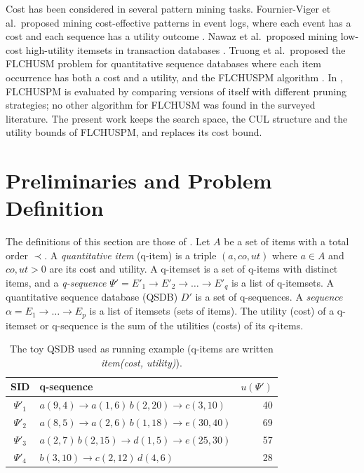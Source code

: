 \documentclass[runningheads]{llncs}
\newcommand{\FL}{\textsc{FLCHUSPM}}
\begin{document}
Cost has been considered in several pattern mining tasks. Fournier-Viger et al.\ proposed
mining cost-effective patterns in event logs, where each event has a cost and each sequence has
a utility outcome \cite{fournier2020cost}. Nawaz et al.\ proposed mining low-cost high-utility
itemsets in transaction databases \cite{nawaz2022lcim}. Truong et al.\ proposed the FLCHUSM
problem for quantitative sequence databases where each item occurrence has both a cost and a
utility, and the \FL{} algorithm \cite{truong2022}. In \cite{truong2022}, \FL{} is evaluated by
comparing versions of itself with different pruning strategies; no other algorithm for FLCHUSM
was found in the surveyed literature. The present work keeps the search space, the CUL structure
and the utility bounds of \FL{}, and replaces its cost bound.

\section{Preliminaries and Problem Definition}\label{sec:prelim}

The definitions of this section are those of \cite{truong2022}. Let $A$ be a set of items with
a total order $\prec$. A \emph{quantitative item} (q-item) is a triple $(a, co, ut)$ where
$a \in A$ and $co, ut > 0$ are its cost and utility. A q-itemset is a set of q-items with
distinct items, and a \emph{q-sequence} $\Psi' = E'_1 \to E'_2 \to \dots \to E'_q$ is a list of
q-itemsets. A quantitative sequence database (QSDB) $D'$ is a set of q-sequences. A
\emph{sequence} $\alpha = E_1 \to \dots \to E_p$ is a list of itemsets (sets of items). The
utility (cost) of a q-itemset or q-sequence is the sum of the utilities (costs) of its q-items.

\begin{table}[t]
\centering
\caption{The toy QSDB used as running example (q-items are written \emph{item(cost, utility)}).}
\label{tab:toy}
\begin{tabular}{@{}cl r@{}}
\toprule
SID & q-sequence & $u(\Psi')$ \\
\midrule
$\Psi'_1$ & $a(9,4) \to a(1,6)\,b(2,20) \to c(3,10)$ & 40 \\
$\Psi'_2$ & $a(8,5) \to a(2,6)\,b(1,18) \to e(30,40)$ & 69 \\
$\Psi'_3$ & $a(2,7)\,b(2,15) \to d(1,5) \to e(25,30)$ & 57 \\
$\Psi'_4$ & $b(3,10) \to c(2,12)\,d(4,6)$ & 28 \\
\bottomrule
\end{tabular}
\end{table}
\end{document}
